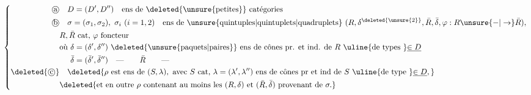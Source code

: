 
\[
\left\{\begin{aligned}
\text{\textcircled{a}}&\quad D=(D',D'')\quad\text{ens de }\deleted{\unsure{\text{petites}}}\text{ catégories}\\
\text{\textcircled{b}}&\quad \sigma=(\sigma_1,\sigma_2),\ \sigma_i\ (i=1,2)\quad\text{ens de }\unsure{\text{quintuples}|\text{quintuplets}|\text{quadruplets}}\ (R,\delta^{\deleted{\unsure{2}}},\bar R,\bar\delta,\varphi:R\unsure{-|\to}\bar R),\\
& R,\bar R\text{ cat, }\varphi\text{ foncteur}\\
&\text{où }\delta=(\delta',\delta'')\ \deleted{\unsure{\text{paquets}|\text{paires}}}\text{ ens de cônes pr. et ind. de } R\text{ \uline{de types }}\underline{\in D}\\
&\phantom{\text{où }}\bar\delta=(\bar\delta',\bar\delta'')\quad\text{---}\qquad \bar R\qquad\text{---}\\
\deleted{\text{\textcircled{c}}}&\quad\deleted{\rho\text{ est ens de }(S,\lambda),\text{ avec }S\text{ cat, }\lambda=(\lambda',\lambda'')\text{ ens de cônes pr et ind de }S\text{ \uline{de type }}\underline{\in D},}\\
&\deleted{\text{et en outre }\rho\text{ contenant au moins les }(R,\delta)\text{ et }(\bar R,\bar\delta)\text{ provenant de }\sigma.}
\end{aligned}\right.
\]

